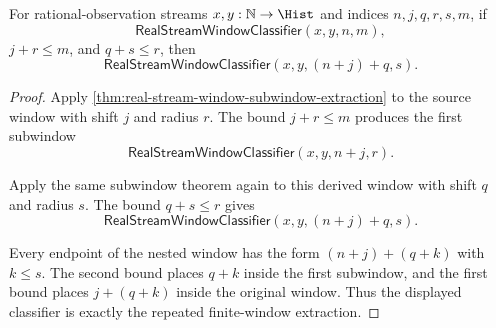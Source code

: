 \begin{theorem}
\label{thm:real-stream-window-nested-subwindow-extraction}
For rational-observation streams $x,y:\mathbb{N}\to\Hist$ and indices
$n,j,q,r,s,m$, if
$$
\mathsf{RealStreamWindowClassifier}(x,y,n,m),
$$
$j+r\le m$, and $q+s\le r$, then
$$
\mathsf{RealStreamWindowClassifier}(x,y,(n+j)+q,s).
$$
\end{theorem}
\begin{proof}
Apply \autoref{thm:real-stream-window-subwindow-extraction} to the source
window with shift $j$ and radius $r$. The bound $j+r\le m$ produces the first
subwindow
$$
\mathsf{RealStreamWindowClassifier}(x,y,n+j,r).
$$

Apply the same subwindow theorem again to this derived window with shift $q$
and radius $s$. The bound $q+s\le r$ gives
$$
\mathsf{RealStreamWindowClassifier}(x,y,(n+j)+q,s).
$$

Every endpoint of the nested window has the form $(n+j)+(q+k)$ with $k\le s$.
The second bound places $q+k$ inside the first subwindow, and the first bound
places $j+(q+k)$ inside the original window. Thus the displayed classifier is
exactly the repeated finite-window extraction.
\end{proof}

